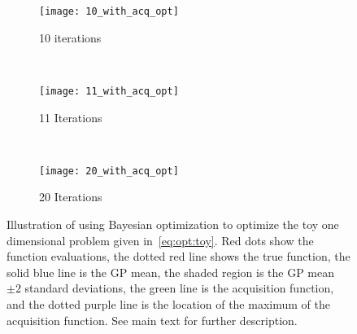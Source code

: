 \begin{figure}[t]
	\centering
	\begin{subfigure}[b]{0.32\textwidth}
		\texttt{[image: 10\_with\_acq\_opt]}
		\caption{10 iterations \label{fig:opt:bayes-opt:10}}
	\end{subfigure}
	~
	\begin{subfigure}[b]{0.32\textwidth}
		\texttt{[image: 11\_with\_acq\_opt]}
		\caption{11 Iterations \label{fig:opt:bayes-opt:11}}
	\end{subfigure}
	~
	\begin{subfigure}[b]{0.32\textwidth}
		\texttt{[image: 20\_with\_acq\_opt]}
		\caption{20 Iterations \label{fig:opt:bayes-opt:20}}
	\end{subfigure}\vspace{5pt}
	\caption{Illustration of using Bayesian optimization to optimize the
		toy one dimensional problem given in~\eqref{eq:opt:toy}.  Red dots show
		the function evaluations,  the dotted red line shows the true function, 
		the solid blue line is the GP mean, the shaded region is the GP mean $\pm 2$
		standard deviations, the green line is the acquisition function, and
		the dotted purple line is the location of the maximum of the acquisition
		function. See main text for further description.\label{fig:opt:bayes-opt}}
\end{figure}

